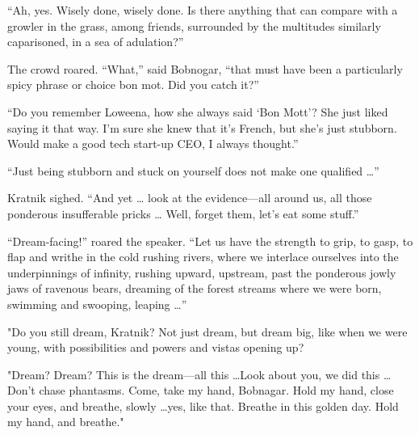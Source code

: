 ``Ah, yes. Wisely done, wisely done. Is there anything that can compare
with a growler in the grass, among friends, surrounded by the multitudes
similarly caparisoned, in a sea of adulation?''

The crowd roared. ``What,'' said Bobnogar, ``that must have been a
particularly spicy phrase or choice bon mot. Did you catch it?''

``Do you remember Loweena, how she always said `Bon Mott'? She just
liked saying it that way. I'm sure she knew that it's French, but she's
just stubborn. Would make a good tech start-up CEO, I always thought.''

``Just being stubborn and stuck on yourself does not make one
qualified \ldots{}''

Kratnik sighed. ``And yet \ldots{} look at the evidence---all around us,
all those ponderous insufferable pricks \ldots{} Well, forget them,
let's eat some stuff.''

``Dream-facing!'' roared the speaker. ``Let us have the strength to
grip, to gasp, to flap and writhe in the cold rushing rivers, where we
interlace ourselves into the underpinnings of infinity, rushing upward,
upstream, past the ponderous jowly jaws of ravenous bears, dreaming of
the forest streams where we were born, swimming and swooping,
leaping \ldots{}''

"Do you still dream, Kratnik? Not just dream, but dream big, like when
we were young, with possibilities and powers and vistas opening up?

"Dream? Dream? This is the dream---all this \ldots Look about you, we did
this \ldots Don't chase phantasms. Come, take my hand, Bobnagar. Hold my
hand, close your eyes, and breathe, slowly \ldots yes, like that. Breathe in
this golden day. Hold my hand, and breathe."
